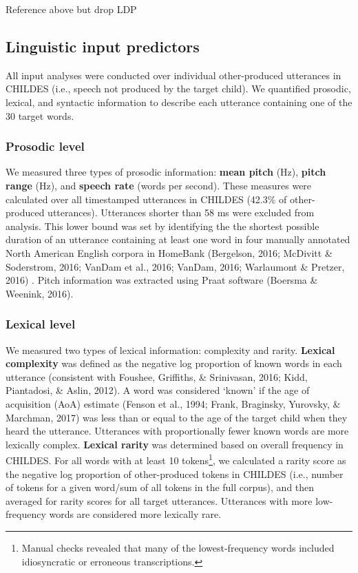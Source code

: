 \documentclass[10pt, letterpaper]{article}
\begin{document}
Reference above but drop LDP

\hypertarget{linguistic-input-predictors}{%
\subsection{Linguistic input
predictors}\label{linguistic-input-predictors}}

All input analyses were conducted over individual other-produced
utterances in CHILDES (i.e., speech not produced by the target child).
We quantified prosodic, lexical, and syntactic information to describe
each utterance containing one of the 30 target words.

\hypertarget{prosodic-level}{%
\subsubsection{Prosodic level}\label{prosodic-level}}

We measured three types of prosodic information: \textbf{mean pitch}
(Hz), \textbf{pitch range} (Hz), and \textbf{speech rate} (words per
second). These measures were calculated over all timestamped utterances
in CHILDES (42.3\% of other-produced utterances). Utterances shorter
than 58 ms were excluded from analysis. This lower bound was set by
identifying the the shortest possible duration of an utterance
containing at least one word in four manually annotated North American
English corpora in HomeBank (Bergelson, 2016; McDivitt \& Soderstrom,
2016; VanDam et al., 2016; VanDam, 2016; Warlaumont \& Pretzer, 2016) .
Pitch information was extracted using Praat software (Boersma \&
Weenink, 2016).

\hypertarget{lexical-level}{%
\subsubsection{Lexical level}\label{lexical-level}}

We measured two types of lexical information: complexity and rarity.
\textbf{Lexical complexity} was defined as the negative log proportion
of known words in each utterance (consistent with Foushee, Griffiths, \&
Srinivasan, 2016; Kidd, Piantadosi, \& Aslin, 2012). A word was
considered `known' if the age of acquisition (AoA) estimate (Fenson et
al., 1994; Frank, Braginsky, Yurovsky, \& Marchman, 2017) was less than
or equal to the age of the target child when they heard the utterance.
Utterances with proportionally fewer known words are more lexically
complex. \textbf{Lexical rarity} was determined based on overall
frequency in CHILDES. For all words with at least 10 tokens\footnote{Manual
  checks revealed that many of the lowest-frequency words included
  idiosyncratic or erroneous transcriptions.}, we calculated a rarity
score as the negative log proportion of other-produced tokens in CHILDES
(i.e., number of tokens for a given word/sum of all tokens in the full
corpus), and then averaged for rarity scores for all target utterances.
Utterances with more low-frequency words are considered more lexically
rare.
\end{document}
